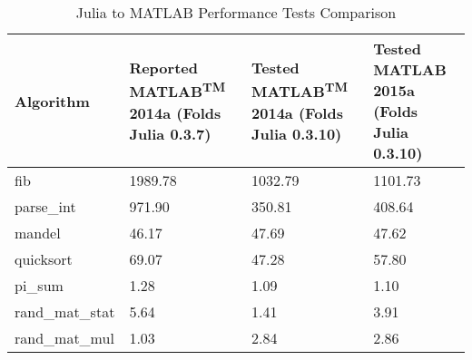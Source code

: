 \begin{table} 
    \begin{tabular}{llll}
    \hline
        Algorithm & Reported MATLAB\textsuperscript{TM} 2014a (Folds Julia 0.3.7) & Tested MATLAB\textsuperscript{TM} 2014a (Folds Julia 0.3.10) & Tested MATLAB 2015a (Folds Julia 0.3.10) \\
        \hline
        fib & 1989.78 & 1032.79 & 1101.73 \\ 
        \hline
        parse\_int & 971.90 & 350.81 & 408.64 \\ 
        \hline
        mandel & 46.17 & 47.69 & 47.62 \\ 
        \hline
        quicksort & 69.07 & 47.28 & 57.80 \\ 
        \hline
        pi\_sum & 1.28 & 1.09 & 1.10 \\ 
        \hline
        rand\_mat\_stat & 5.64 & 1.41 & 3.91 \\ 
        \hline
        rand\_mat\_mul & 1.03 & 2.84 & 2.86 \\ 
    \end{tabular}
    \caption{Julia to MATLAB Performance Tests Comparison}
\end{table}

  
  
  
  
  
  
  
  
  
  
  
  
  
  
  
  
  
  
  
  
  
  
  
  
  
  
  
  
  
  
  
  
  